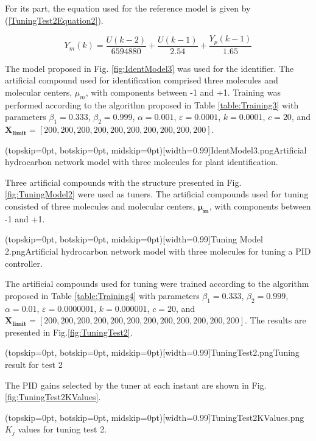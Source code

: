 \documentclass{ieeeaccess}
\begin{document}
For its part, the equation used for the reference model is given by (\ref{TuningTest2Equation2}).

\begin{equation}\label{TuningTest2Equation2}
Y_m(k)=\frac{U(k-2)}{6594880}+\frac{U(k-1)}{2.54}+\frac{Y_p(k-1)}{1.65}
\end{equation}

The model proposed in Fig. \ref{fig:IdentModel3} was used for the identifier. The artificial compound used for identification comprised three molecules and molecular centers, \(\mu_m\), with components between -1 and +1. Training was performed according to the algorithm proposed in Table \ref{table:Training3} with parameters \(\beta_1=0.333\), \(\beta_2=0.999\), \(\alpha=0.001\), \(\varepsilon=0.0001\), \(k=0.0001\), \(c=20\), and \(\mathbf{X_{limit}}=[200,200,200,200,200,200,200,200,200,200]\).

\Figure[ht!](topskip=0pt, botskip=0pt, midskip=0pt)[width=0.99\columnwidth]{IdentModel3.png}{Artificial hydrocarbon network model with three molecules for plant identification\label{fig:IdentModel3}.}

Three artificial compounds with the structure presented in Fig. \ref{fig:TuningModel2} were used as tuners. The artificial compounds used for tuning consisted of three molecules and molecular centers, \(\mathbf{\mu_m}\), with components between -1 and +1.

\Figure[ht!](topskip=0pt, botskip=0pt, midskip=0pt)[width=0.99\columnwidth]{Tuning Model 2.png}{Artificial hydrocarbon network model with three molecules for tuning a PID controller\label{fig:TuningModel2}.}

The artificial compounds used for tuning were trained according to the algorithm proposed in Table \ref{table:Training4} with parameters \(\beta_1=0.333\), \(\beta_2=0.999\), \(\alpha=0.01\), \(\varepsilon=0.0000001\), \( k=0.000001\), \(c=20\), and \(\mathbf{X_{limit}}=[200,200,200,200,200,200,200,200,200,200,200,200]\). The results are presented in Fig.\ref{fig:TuningTest2}.

\Figure[ht!](topskip=0pt, botskip=0pt, midskip=0pt)[width=0.99\columnwidth]{TuningTest2.png}{Tuning result for test 2 \label{fig:TuningTest2}}

The PID gains selected by the tuner at each instant are shown in Fig.\ref{fig:TuningTest2KValues}.

\Figure[ht!](topskip=0pt, botskip=0pt, midskip=0pt)[width=0.99\columnwidth]{TuningTest2KValues.png}{\(K_j\) values for tuning test 2\label{fig:TuningTest2KValues}.}
\end{document}
